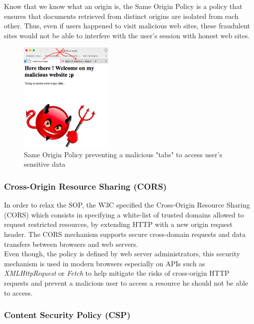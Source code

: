 \documentclass[journal]{IEEEtran}
\begin{document}
\medskip

Know that we know what an origin is, the Same Origin Policy is a policy that ensures that documents retrieved from distinct origins are isolated from each other. Thus, even if users happened to visit malicious web sites, these fraudulent sites would not be able to interfere with the user's session with honest web sites.

\begin{figure}[h]
\centering
\includegraphics[width=0.4\textwidth]{images/SOPTabs.png}
\caption{Same Origin Policy preventing a malicious "tabs" to access user's sensitive data}
\label{fig:SOPTabs}
\end{figure}

\subsubsection{Cross-Origin Resource Sharing (CORS)}
\label{CORSSection}

In order to relax the SOP, the W3C specified the Cross-Origin Resource Sharing (CORS) which consists in specifying a white-list of trusted domains allowed to request restricted resources, by extending HTTP with a new origin request header. The CORS mechanism supports secure cross-domain requests and data transfers between browsers and web servers. \\

Even though, the policy is defined by web server administrators, this security mechanism is used in modern browsers especially on APIs such as \emph{XMLHttpRequest} or \emph{Fetch} to help mitigate the risks of cross-origin HTTP requests and prevent a malicious user to access a resource he should not be able to access.

\subsubsection{Content Security Policy (CSP)}
\end{document}
